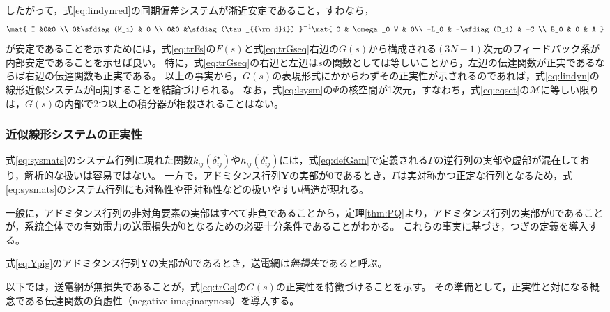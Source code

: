 \documentclass[tombow,dvipdfmx]{corona-a5}
\begin{document}
したがって，式\ref{eq:lindynred}の同期偏差システムが漸近安定であること，すわなち，
\begin{align*}
\mat{
I &0&0 \\
0&\sfdiag(M_i) & 0 \\
0&0 &\sfdiag(\tau_{{\rm d}i}) 
}^{-1}
\mat{
 0 & \omega_0 W & 0\\
  -L_0 & -\sfdiag(D_i) & -C \\
 B_0 & 0 & A
 }
\end{align*}
が安定であることを示すためには，式\ref{eq:trFs}の$F(s)$と式\ref{eq:trGseq}右辺の$G(s)$から構成される$(3N-1)$次元のフィードバック系が内部安定であることを示せば良い。
特に，式\ref{eq:trGseq}の右辺と左辺は$s$の関数としては等しいことから，左辺の伝達関数が正実であるならば右辺の伝達関数も正実である。
以上の事実から，$G(s)$の表現形式にかからわずその正実性が示されるのであれば，式\ref{eq:lindyn}の線形近似システムが同期することを結論づけられる。
なお，式\ref{eq:lsysm}の$\Psi$の核空間が1次元，すなわち，式\ref{eq:eqset}の$\mathcal{M}$に等しい限りは，$G(s)$の内部で2つ以上の積分器が相殺されることはない。

\subsubsection{近似線形システムの正実性}

式\ref{eq:sysmats}のシステム行列に現れた関数$k_{ij}(\delta_{ij}^{\star})$や$h_{ij}(\delta_{ij}^{\star})$には，式\ref{eq:defGam}で定義される$\bm{\mathit{\Gamma}}$の逆行列の実部や虚部が混在しており，解析的な扱いは容易ではない。
一方で，アドミタンス行列$\bm{Y}$の実部が0であるとき，$\bm{\mathit{\Gamma}}$は実対称かつ正定な行列となるため，式\ref{eq:sysmats}のシステム行列にも対称性や歪対称性などの扱いやすい構造が現れる。

一般に，アドミタンス行列の非対角要素の実部はすべて非負であることから，定理\ref{thm:PQ}より，アドミタンス行列の実部が0であることが，系統全体での有効電力の送電損失が0となるための必要十分条件であることがわかる。
これらの事実に基づき，つぎの定義を導入する。

\begin{定義}[無損失な送電網]\label{def:lless}
式\ref{eq:Ypig}のアドミタンス行列$\bm{Y}$の実部が0であるとき，送電網は\emph{無損失}であると呼ぶ。
\end{定義}

以下では，送電網が無損失であることが，式\ref{eq:trGs}の$G(s)$の正実性を特徴づけることを示す。
その準備として，正実性と対になる概念である伝達関数の負虚性（negative imaginaryness）を導入する\cite{petersen2010feedback,xiong2010negative}。
\end{document}
